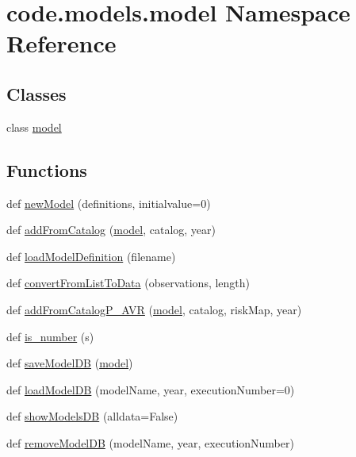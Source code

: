 \hypertarget{namespacecode_1_1models_1_1model}{}\section{code.\+models.\+model Namespace Reference}
\label{namespacecode_1_1models_1_1model}
\subsection*{Classes}
\begin{DoxyCompactItemize}
\item 
class \hyperlink{classcode_1_1models_1_1model_1_1model}{model}
\end{DoxyCompactItemize}
\subsection*{Functions}
\begin{DoxyCompactItemize}
\item 
def \hyperlink{namespacecode_1_1models_1_1model_ad4cd9f5c3ee9cb21283e98f1dcd9d81b}{new\+Model} (definitions, initialvalue=0)
\item 
def \hyperlink{namespacecode_1_1models_1_1model_aa5b70c0dbb95cdcca3fae1082f4b4a93}{add\+From\+Catalog} (\hyperlink{classcode_1_1models_1_1model_1_1model}{model}, catalog, year)
\item 
def \hyperlink{namespacecode_1_1models_1_1model_a516aba6a18e97e9ca010b3b8ce66d033}{load\+Model\+Definition} (filename)
\item 
def \hyperlink{namespacecode_1_1models_1_1model_aff45090e2bdcb7f7a6dcc6ae34007cb2}{convert\+From\+List\+To\+Data} (observations, length)
\item 
def \hyperlink{namespacecode_1_1models_1_1model_ad191be2a9a695565c7e247a98bb0a795}{add\+From\+Catalog\+P\+\_\+\+A\+VR} (\hyperlink{classcode_1_1models_1_1model_1_1model}{model}, catalog, risk\+Map, year)
\item 
def \hyperlink{namespacecode_1_1models_1_1model_aea26030520874960047c9aa8ef2e00a0}{is\+\_\+number} (s)
\item 
def \hyperlink{namespacecode_1_1models_1_1model_a6b534b3e2781503a4de7e2e594df0e11}{save\+Model\+DB} (\hyperlink{classcode_1_1models_1_1model_1_1model}{model})
\item 
def \hyperlink{namespacecode_1_1models_1_1model_af416cfbe0575d995dc58ec43631223bf}{load\+Model\+DB} (model\+Name, year, execution\+Number=0)
\item 
def \hyperlink{namespacecode_1_1models_1_1model_afbaa3eda93515aef72fbc2d65ed86ddb}{show\+Models\+DB} (alldata=False)
\item 
def \hyperlink{namespacecode_1_1models_1_1model_af176247b55143d08b3c6ea471845f330}{remove\+Model\+DB} (model\+Name, year, execution\+Number)
\end{DoxyCompactItemize}


